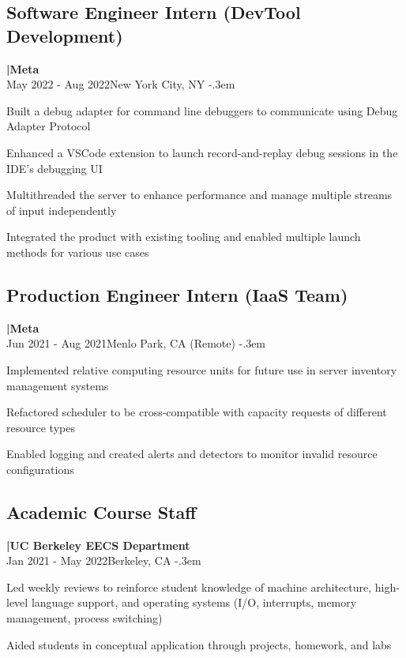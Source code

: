 \documentclass{article}
\let\olditemize=\itemize \let\endolditemize=\enditemize
\renewenvironment{itemize}{\olditemize[topsep=0em] \itemsep-.3em}{\endolditemize}
\newcommand{\entry}[3]{\quad\textbf{|\quad#1}\\#2\qquad#3}
\begin{document}
\subsection{Software Engineer Intern (DevTool Development)}
\entry{Meta}{May 2022 - Aug 2022}{New York City, NY}
\begin{itemize}
  \item Built a debug adapter for command line debuggers to communicate using Debug Adapter Protocol
  \item Enhanced a VSCode extension to launch record-and-replay debug sessions in the IDE's debugging UI
  \item Multithreaded the server to enhance performance and manage multiple streams of input independently
  \item Integrated the product with existing tooling and enabled multiple launch methods for various use cases
\end{itemize}

\subsection{Production Engineer Intern (IaaS Team)}
\entry{Meta}{Jun 2021 - Aug 2021}{Menlo Park, CA (Remote)}
\begin{itemize}
  \item Implemented relative computing resource units for future use in server inventory management systems
  \item Refactored scheduler to be cross-compatible with capacity requests of different resource types
  \item Enabled logging and created alerts and detectors to monitor invalid resource configurations
\end{itemize}

\subsection{Academic Course Staff}
\entry{UC Berkeley EECS Department}{Jan 2021 - May 2022}{Berkeley, CA}
\begin{itemize}
  \item Led weekly reviews to reinforce student knowledge of machine architecture, high-level language support, and operating systems (I/O, interrupts, memory management, process switching)
  \item Aided students in conceptual application through projects, homework, and labs
\end{itemize}
\end{document}
